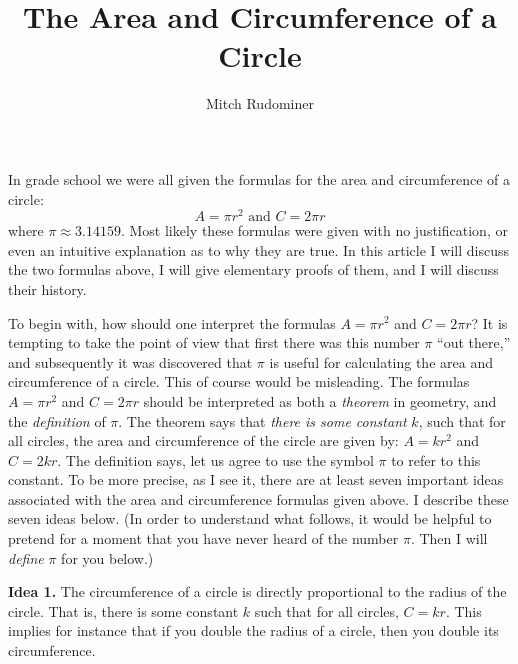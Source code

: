 \documentclass[twoside,twocolumn,12pt]{amsart}
\theoremstyle{plain}
\theoremstyle{definition}
\begin{document}
\thispagestyle{empty}

\title{The Area and Circumference of a Circle}

\author{Mitch Rudominer}

%

\maketitle

\thispagestyle{empty}

In grade school we were all given the formulas for the area and
circumference of a circle:
$$A=\pi r^2 \text{ and } C = 2\pi r$$
where $\pi\approx 3.14159$.
Most likely these formulas were given with no justification, or even
an intuitive explanation as to why they are true.  In this article
I will discuss the two formulas above, I will give elementary proofs
of them, and I will discuss their history.

To begin with, how should one interpret the formulas $A=\pi r^2$ and
$C=2\pi r$? It is tempting to take the point of view that first
there was this number $\pi$ ``out there,'' and subsequently
 it was discovered
that $\pi$ is useful for
calculating the area and circumference of a circle. This of course would be
misleading.
 The formulas $A=\pi r^2$ and $C=2\pi r$ should be interpreted
as both a \emph{theorem} in geometry, and the \emph{definition} of $\pi$.
The
theorem says that \emph{there is some constant} $k$, such that
for all circles, the area and circumference of the circle are given
by:  $A=k r^2$ and $C=2 k r$. The definition says,
let us agree to use the symbol $\pi$ to refer to this constant.
To be more precise, as I see it, there are at least seven important ideas
associated with the area and circumference formulas given above.
I describe these seven ideas below.
(In order to understand what follows, it would be helpful to
pretend
for a moment that you have never heard of the number $\pi$. Then I will
\emph{define} $\pi$ for you below.)

\vspace{0.1in}

\noindent
\textbf{Idea 1.}
The circumference of a circle is directly proportional to
the radius of the circle. That is, there is some constant $k$ such
that for all circles,  $C=k r$. This implies for instance that if you
double the radius of a circle, then you double its circumference.
\end{document}
